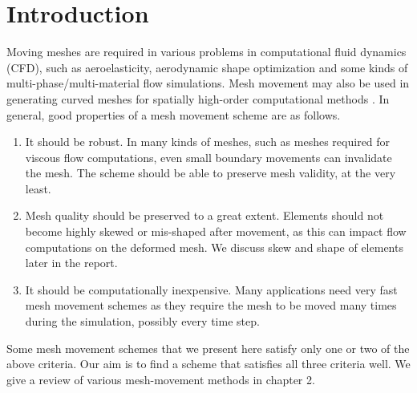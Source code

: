 \chapter{Introduction}

Moving meshes are required in various problems in computational fluid dynamics (CFD), such as aeroelasticity, aerodynamic shape optimization \cite{appl:opt} and some kinds of multi-phase/multi-material flow simulations. Mesh movement may also be used in generating curved meshes for spatially high-order computational methods \cite{curve:persson}. In general, good properties of a mesh movement scheme are as follows.
\begin{enumerate}
\item It should be robust. In many kinds of meshes, such as meshes required for viscous flow computations, even small boundary movements can invalidate the mesh. The scheme should be able to preserve mesh validity, at the very least.
\item Mesh quality should be preserved to a great extent. Elements should not become highly skewed or mis-shaped after movement, as this can impact flow computations on the deformed mesh. We discuss skew and shape of elements later in the report.
\item It should be computationally inexpensive. Many applications need very fast mesh movement schemes as they require the mesh to be moved many times during the simulation, possibly every time step.
\end{enumerate}
Some mesh movement schemes that we present here satisfy only one or two of the above criteria. Our aim is to find a scheme that satisfies all three criteria well. We give a review of various mesh-movement methods in chapter 2.

